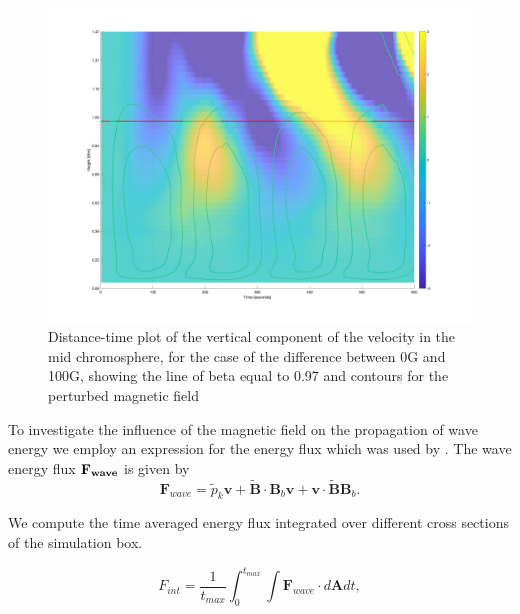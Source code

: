 \documentclass[linenumbers]{aastex63}
\begin{document}
\begin{figure}
\centering
\label{td_vert_dif_bv0G_100G_300}
\includegraphics[scale=0.3]{td_vert_dif_bv0G_100G_300.jpg}
\caption{Distance-time plot of the vertical component of the velocity in the mid chromosphere, for the case of the difference between 0G and 100G, showing the line of beta equal to 0.97 and contours for the perturbed magnetic field}
\end{figure}


To investigate the influence of the magnetic field on the propagation of wave energy we employ an expression for the energy flux which was used by \citet{Bogdan2003}. The wave energy flux $\bf{F}_{wave}$ is given by
$$
{\mathbf F}_{wave}=\tilde{p}_{k} {\mathbf v}+\tilde{\mathbf B}\cdot {\mathbf B_{b}}{\mathbf v}+{\mathbf v}\cdot \tilde{\mathbf B}{\mathbf B_{b}} .
$$

We compute the time averaged energy flux integrated over different cross sections of the simulation box.

\begin{equation}
F_{int}= \frac{1}{t_{max}} \int_{0}^{t_{max}} \int {\mathbf F}_{wave} \cdot d{\mathbf A}dt,
\label{e11}
\end{equation}
\end{document}

